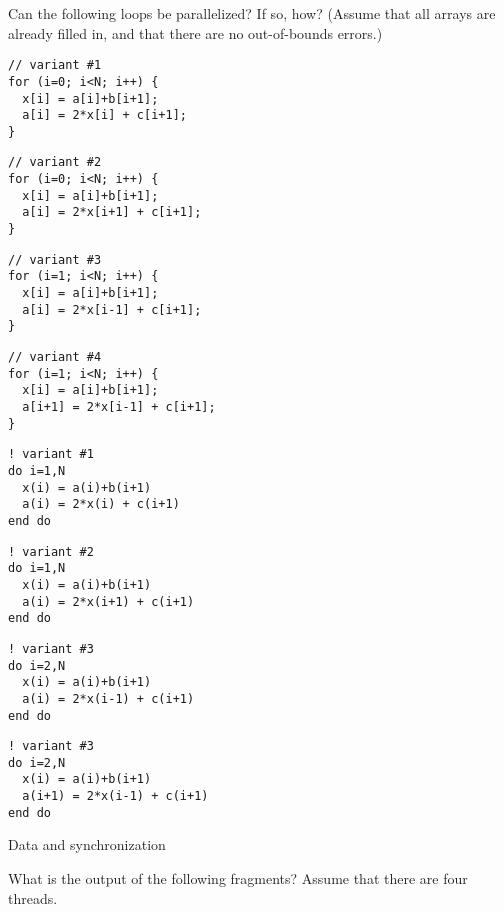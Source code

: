 Can the following loops be parallelized? If so, how?
(Assume that all arrays are already filled in,
and that there are no out-of-bounds errors.) 
\lstset{language=C}
\begin{multicols}{2}
\small
\begin{lstlisting}
// variant #1
for (i=0; i<N; i++) {
  x[i] = a[i]+b[i+1];
  a[i] = 2*x[i] + c[i+1];
}
\end{lstlisting}

\begin{lstlisting}
// variant #2
for (i=0; i<N; i++) {
  x[i] = a[i]+b[i+1];
  a[i] = 2*x[i+1] + c[i+1];
}
\end{lstlisting}
\columnbreak

\begin{lstlisting}
// variant #3
for (i=1; i<N; i++) {
  x[i] = a[i]+b[i+1];
  a[i] = 2*x[i-1] + c[i+1];
}
\end{lstlisting}

\begin{lstlisting}
// variant #4
for (i=1; i<N; i++) {
  x[i] = a[i]+b[i+1];
  a[i+1] = 2*x[i-1] + c[i+1];
}
\end{lstlisting}
\end{multicols}

\lstset{language=Fortran}
\begin{multicols}{2}
\small
\begin{lstlisting}
! variant #1
do i=1,N
  x(i) = a(i)+b(i+1)
  a(i) = 2*x(i) + c(i+1)
end do
\end{lstlisting}

\begin{lstlisting}
! variant #2
do i=1,N
  x(i) = a(i)+b(i+1)
  a(i) = 2*x(i+1) + c(i+1)
end do
\end{lstlisting}
\columnbreak

\begin{lstlisting}
! variant #3
do i=2,N
  x(i) = a(i)+b(i+1)
  a(i) = 2*x(i-1) + c(i+1)
end do
\end{lstlisting}

\begin{lstlisting}
! variant #3
do i=2,N
  x(i) = a(i)+b(i+1)
  a(i+1) = 2*x(i-1) + c(i+1)
end do
\end{lstlisting}
\end{multicols}

\vfill\pagebreak

 {Data and synchronization}

 {}

What is the output of the following fragments? Assume that there are four threads.

